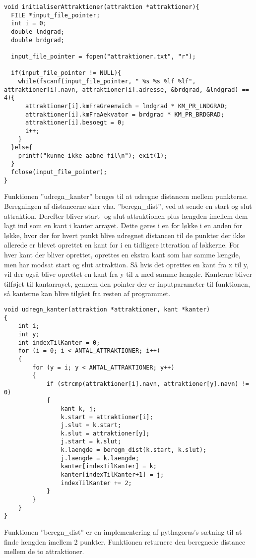 \begin{lstlisting}
void initialiserAttraktioner(attraktion *attraktioner){
  FILE *input_file_pointer;
  int i = 0;
  double lndgrad;
  double brdgrad;

  input_file_pointer = fopen("attraktioner.txt", "r");

  if(input_file_pointer != NULL){
    while(fscanf(input_file_pointer, " %s %s %lf %lf", attraktioner[i].navn, attraktioner[i].adresse, &brdgrad, &lndgrad) == 4){
      attraktioner[i].kmFraGreenwich = lndgrad * KM_PR_LNDGRAD;
      attraktioner[i].kmFraAekvator = brdgrad * KM_PR_BRDGRAD;
      attraktioner[i].besoegt = 0;
      i++;
    }
  }else{
    printf("kunne ikke aabne fil\n"); exit(1);
  }
  fclose(input_file_pointer);
} 
\end{lstlisting}

Funktionen ”udregn\_kanter” bruges til at udregne distancen mellem punkterne. Beregningen af distancerne sker vha. ”beregn\_dist”, ved at sende en start og slut attraktion. Derefter bliver start- og slut attraktionen plus længden imellem dem lagt ind som en kant i kanter arrayet. Dette gøres i en for løkke i en anden for løkke, hvor der for hvert punkt blive udregnet distancen til de punkter der ikke allerede er blevet oprettet en kant for i en tidligere itteration af løkkerne. For hver kant der bliver oprettet, oprettes en ekstra kant som har samme længde, men har modsat start og slut attraktion. Så hvis det oprettes en kant fra x til y, vil der også blive oprettet en kant fra y til x med samme længde. Kanterne bliver tilføjet til kantarrayet, gennem den pointer der er inputparameter til funktionen, så kanterne kan blive tilgået fra resten af programmet. \newline

\begin{lstlisting}
void udregn_kanter(attraktion *attraktioner, kant *kanter)
{
	int i;
	int y;
	int indexTilKanter = 0;
	for (i = 0; i < ANTAL_ATTRAKTIONER; i++)
	{
		for (y = i; y < ANTAL_ATTRAKTIONER; y++)
		{
			if (strcmp(attraktioner[i].navn, attraktioner[y].navn) != 0)
			{
				kant k, j;
				k.start = attraktioner[i];
				j.slut = k.start;
				k.slut = attraktioner[y];
				j.start = k.slut;
				k.laengde = beregn_dist(k.start, k.slut);
				j.laengde = k.laengde;
				kanter[indexTilKanter] = k;
				kanter[indexTilKanter+1] = j;
				indexTilKanter += 2;
			}
		}
	}
}
\end{lstlisting}

Funktionen ”beregn\_dist” er en implementering af pythagoras's sætning til at finde længden imellem 2 punkter. Funktionen returnere den beregnede distance mellem de to attraktioner. \newline

